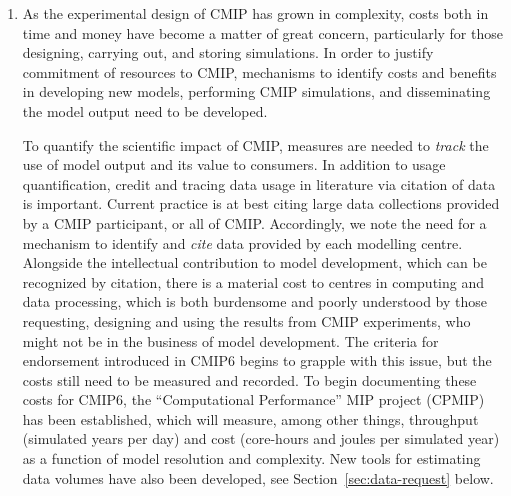 \documentclass[gmd,manuscript]{copernicus}
\begin{document}
\begin{enumerate}
  In addition, there is an increased interest in climate analytics as
  a service \citep{ref:balajietal2011,ref:schnaseetal2017}. This
  follows the principle of placing analysis close to the data. Some
  centres plan to add resources that combine archival and analysis
  capabilities, e.g., NCAR's
  \href{https://www2.cisl.ucar.edu/resources/cmip-analysis-platform
  }{CMIP Analysis
    Platform}\footnote{https://www2.cisl.ucar.edu/resources/cmip-analysis-platform
    , retrieved \today.} , or the UK's JASMIN
  \citep{ref:lawrenceetal2013}.. There are also new efforts to bring
  climate data storage and analysis to the cloud era
  \citep[e.g][]{ref:duffyetal2015}. Platforms such as
  \href{http://pangeo-data.org/}{Pangeo}\footnote{http://pangeo-data.org/,
    retrieved \today.} show promise in this realm, and widespread
  experimentation and adoption is encouraged.
\item As the experimental design of CMIP has grown in complexity,
  costs both in time and money have become a matter of great concern,
  particularly for those designing, carrying out, and storing
  simulations. In order to justify commitment of resources to CMIP,
  mechanisms to identify costs and benefits in developing new models,
  performing CMIP simulations, and disseminating the model output need
  to be developed.

  To quantify the scientific impact of CMIP, measures are needed to
  \emph{track} the use of model output and its value to consumers. In
  addition to usage quantification, credit and tracing data usage in
  literature via citation of data is important. Current practice is at
  best citing large data collections provided by a CMIP participant,
  or all of CMIP. Accordingly, we note the need for a mechanism to
  identify and \emph{cite} data provided by each modelling centre.
  Alongside the intellectual contribution to model development, which
  can be recognized by citation, there is a material cost to centres
  in computing and data processing, which is both burdensome and
  poorly understood by those requesting, designing and using the
  results from CMIP experiments, who might not be in the business of
  model development. The criteria for endorsement introduced in CMIP6
  \citep[see Table~1 in][]{ref:eyringetal2016a} begins to grapple with
  this issue, but the costs still need to be measured and recorded. To
  begin documenting these costs for CMIP6, the ``Computational
  Performance'' MIP project (CPMIP) \citep{ref:balajietal2017} has
  been established, which will measure, among other things, throughput
  (simulated years per day) and cost (core-hours and joules per
  simulated year) as a function of model resolution and complexity.
  New tools for estimating data volumes have also been developed, see
  Section~\ref{sec:data-request} below.


\end{enumerate}
\end{document}
